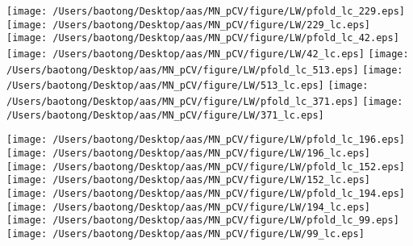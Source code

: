 \documentclass{aastex63}
\begin{document}
\clearpage
\begin{figure*}[!ht]
\centering
\texttt{[image: /Users/baotong/Desktop/aas/MN\_pCV/figure/LW/pfold\_lc\_229.eps]}
\hfill
\texttt{[image: /Users/baotong/Desktop/aas/MN\_pCV/figure/LW/229\_lc.eps]}
\hfill
{}
\texttt{[image: /Users/baotong/Desktop/aas/MN\_pCV/figure/LW/pfold\_lc\_42.eps]}
\hfill
\texttt{[image: /Users/baotong/Desktop/aas/MN\_pCV/figure/LW/42\_lc.eps]}
\hfill
{}
\texttt{[image: /Users/baotong/Desktop/aas/MN\_pCV/figure/LW/pfold\_lc\_513.eps]}
\hfill
\texttt{[image: /Users/baotong/Desktop/aas/MN\_pCV/figure/LW/513\_lc.eps]}
\hfill
{}
\texttt{[image: /Users/baotong/Desktop/aas/MN\_pCV/figure/LW/pfold\_lc\_371.eps]}
\hfill
\texttt{[image: /Users/baotong/Desktop/aas/MN\_pCV/figure/LW/371\_lc.eps]}
\hfill
{}
\end{figure*}
\clearpage
\begin{figure*}[!ht]
\centering
\texttt{[image: /Users/baotong/Desktop/aas/MN\_pCV/figure/LW/pfold\_lc\_196.eps]}
\hfill
\texttt{[image: /Users/baotong/Desktop/aas/MN\_pCV/figure/LW/196\_lc.eps]}
\hfill
{}
\texttt{[image: /Users/baotong/Desktop/aas/MN\_pCV/figure/LW/pfold\_lc\_152.eps]}
\hfill
\texttt{[image: /Users/baotong/Desktop/aas/MN\_pCV/figure/LW/152\_lc.eps]}
\hfill
{}
\texttt{[image: /Users/baotong/Desktop/aas/MN\_pCV/figure/LW/pfold\_lc\_194.eps]}
\hfill
\texttt{[image: /Users/baotong/Desktop/aas/MN\_pCV/figure/LW/194\_lc.eps]}
\hfill
{}
\texttt{[image: /Users/baotong/Desktop/aas/MN\_pCV/figure/LW/pfold\_lc\_99.eps]}
\hfill
\texttt{[image: /Users/baotong/Desktop/aas/MN\_pCV/figure/LW/99\_lc.eps]}
\hfill
{}
\end{figure*}
\end{document}
